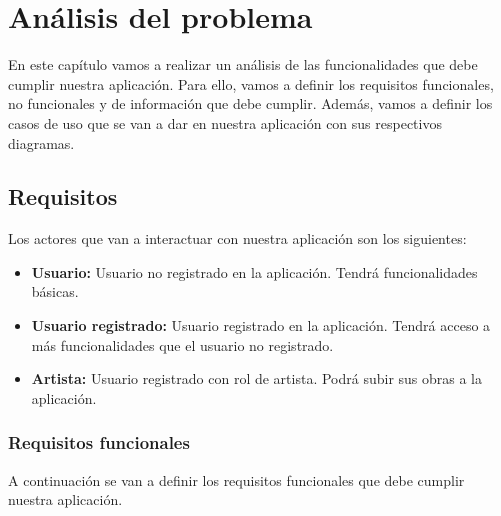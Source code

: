 \chapter{Análisis del problema}
En este capítulo vamos a realizar un análisis de las funcionalidades que debe cumplir
nuestra aplicación. Para ello, vamos a definir los requisitos funcionales,
no funcionales y de información que debe cumplir. Además, vamos a definir los
casos de uso que se van a dar en nuestra aplicación con sus respectivos diagramas.

\section{Requisitos}
Los actores que van a interactuar con nuestra aplicación son los siguientes:

\begin{itemize}
    \item \textbf{Usuario:} Usuario no registrado en la aplicación. Tendrá funcionalidades
    básicas.
    \item \textbf{Usuario registrado:} Usuario registrado en la aplicación. Tendrá
    acceso a más funcionalidades que el usuario no registrado.
    \item \textbf{Artista:} Usuario registrado con rol de artista. Podrá subir sus
    obras a la aplicación.
\end{itemize}

\subsection{Requisitos funcionales}
A continuación se van a definir los requisitos funcionales que debe cumplir nuestra
aplicación.

